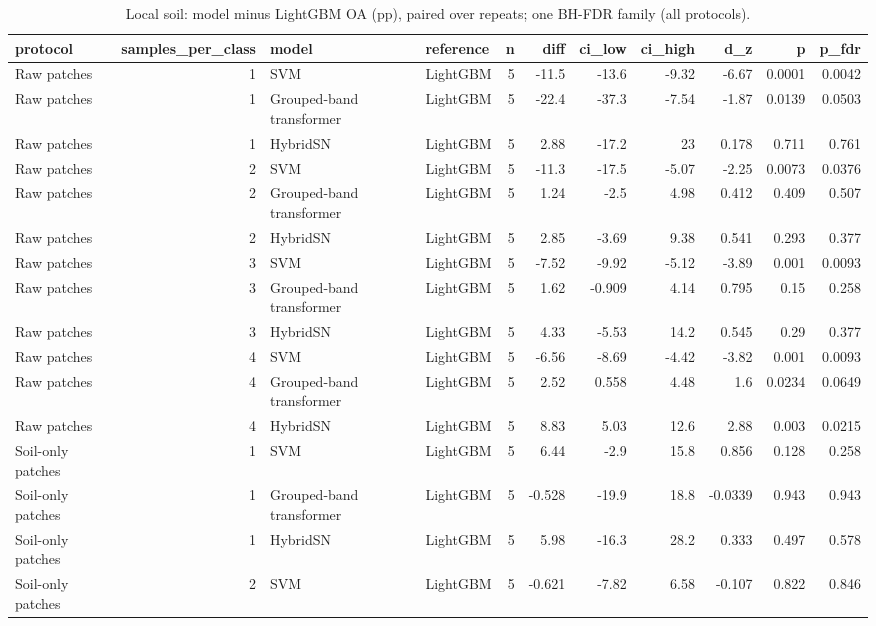 \begin{table}
\caption{Local soil: model minus LightGBM OA (pp), paired over repeats; one BH-FDR family (all protocols).}
\label{tab:stats_soil_vs_lightgbm}
\begin{tabular}{lrllrrrrrrr}
\toprule
protocol & samples\_per\_class & model & reference & n & diff & ci\_low & ci\_high & d\_z & p & p\_fdr \\
\midrule
Raw patches & 1 & SVM & LightGBM & 5 & -11.5 & -13.6 & -9.32 & -6.67 & 0.0001 & 0.0042 \\
Raw patches & 1 & Grouped-band transformer & LightGBM & 5 & -22.4 & -37.3 & -7.54 & -1.87 & 0.0139 & 0.0503 \\
Raw patches & 1 & HybridSN & LightGBM & 5 & 2.88 & -17.2 & 23 & 0.178 & 0.711 & 0.761 \\
Raw patches & 2 & SVM & LightGBM & 5 & -11.3 & -17.5 & -5.07 & -2.25 & 0.0073 & 0.0376 \\
Raw patches & 2 & Grouped-band transformer & LightGBM & 5 & 1.24 & -2.5 & 4.98 & 0.412 & 0.409 & 0.507 \\
Raw patches & 2 & HybridSN & LightGBM & 5 & 2.85 & -3.69 & 9.38 & 0.541 & 0.293 & 0.377 \\
Raw patches & 3 & SVM & LightGBM & 5 & -7.52 & -9.92 & -5.12 & -3.89 & 0.001 & 0.0093 \\
Raw patches & 3 & Grouped-band transformer & LightGBM & 5 & 1.62 & -0.909 & 4.14 & 0.795 & 0.15 & 0.258 \\
Raw patches & 3 & HybridSN & LightGBM & 5 & 4.33 & -5.53 & 14.2 & 0.545 & 0.29 & 0.377 \\
Raw patches & 4 & SVM & LightGBM & 5 & -6.56 & -8.69 & -4.42 & -3.82 & 0.001 & 0.0093 \\
Raw patches & 4 & Grouped-band transformer & LightGBM & 5 & 2.52 & 0.558 & 4.48 & 1.6 & 0.0234 & 0.0649 \\
Raw patches & 4 & HybridSN & LightGBM & 5 & 8.83 & 5.03 & 12.6 & 2.88 & 0.003 & 0.0215 \\
Soil-only patches & 1 & SVM & LightGBM & 5 & 6.44 & -2.9 & 15.8 & 0.856 & 0.128 & 0.258 \\
Soil-only patches & 1 & Grouped-band transformer & LightGBM & 5 & -0.528 & -19.9 & 18.8 & -0.0339 & 0.943 & 0.943 \\
Soil-only patches & 1 & HybridSN & LightGBM & 5 & 5.98 & -16.3 & 28.2 & 0.333 & 0.497 & 0.578 \\
Soil-only patches & 2 & SVM & LightGBM & 5 & -0.621 & -7.82 & 6.58 & -0.107 & 0.822 & 0.846 \\

\end{tabular}
\end{table}
